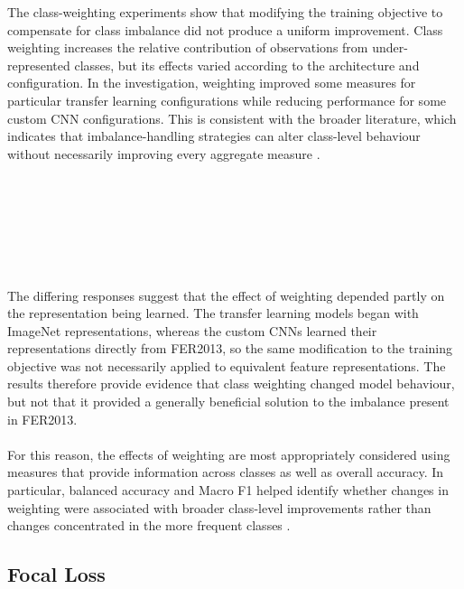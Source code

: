 \documentclass[12pt, a4paper]{report}
\let\oldsubsection\subsection
\renewcommand{\subsection}{%
    \Needspace{6\baselineskip}%
    \oldsubsection
}
\begin{document}
				The class-weighting experiments show that modifying the training objective to compensate for class imbalance did not produce a uniform improvement. Class weighting increases the relative contribution of observations from under-represented classes, but its effects varied according to the architecture and configuration. In the investigation, weighting improved some measures for particular transfer learning configurations while reducing performance for some custom CNN configurations. This is consistent with the broader literature, which indicates that imbalance-handling strategies can alter class-level behaviour without necessarily improving every aggregate measure \cite{Johnson2019ClassImbalance, Hunafa2026FERImbalance}.\\\\\\\\\\\\\\\\
				The differing responses suggest that the effect of weighting depended partly on the representation being learned. The transfer learning models began with ImageNet representations, whereas the custom CNNs learned their representations directly from FER2013, so the same modification to the training objective was not necessarily applied to equivalent feature representations. The results therefore provide evidence that class weighting changed model behaviour, but not that it provided a generally beneficial solution to the imbalance present in FER2013.\\\\
				For this reason, the effects of weighting are most appropriately considered using measures that provide information across classes as well as overall accuracy. In particular, balanced accuracy and Macro F1 helped identify whether changes in weighting were associated with broader class-level improvements rather than changes concentrated in the more frequent classes \cite{Johnson2019ClassImbalance, Farhadpour2024MetricsImbalance}.
				
			\subsection{Focal Loss}
				
\end{document}
